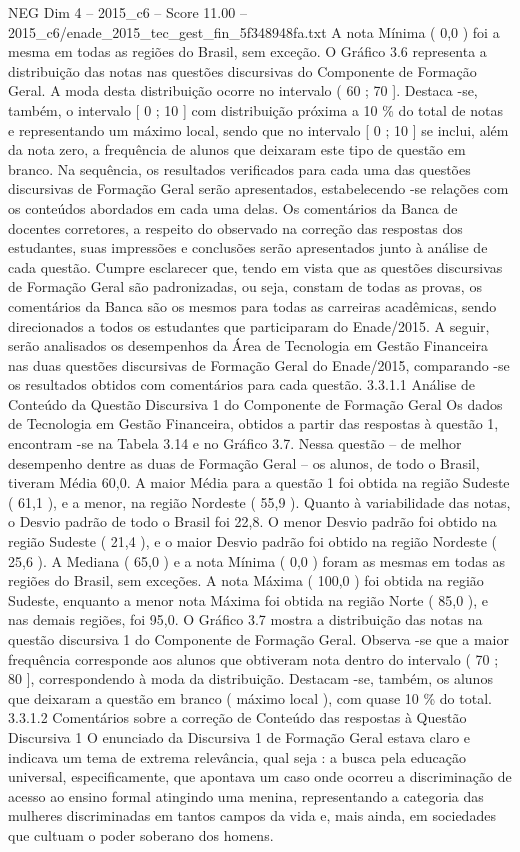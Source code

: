 \begin{textsample}{NEG Dim 4 – 2015\_c6 – Score 11.00 – 2015\_c6/enade\_2015\_tec\_gest\_fin\_5f348948fa.txt}
A nota Mínima ( 0,0 ) foi a mesma em todas as regiões do Brasil, sem exceção.
O Gráfico 3.6 representa a distribuição das notas nas questões discursivas do Componente de Formação Geral.
A moda desta distribuição ocorre no intervalo ( 60 ; 70 ].
Destaca -se, também, o intervalo [ 0 ; 10 ] com distribuição próxima a 10 \% do total de notas e representando um máximo local, sendo que no intervalo [ 0 ; 10 ] se inclui, além da nota zero, a frequência de alunos que deixaram este tipo de questão em branco.
Na sequência, os resultados verificados para cada uma das questões discursivas de Formação Geral serão apresentados, estabelecendo -se relações com os conteúdos abordados em cada uma delas.
Os comentários da Banca de docentes corretores, a respeito do observado na correção das respostas dos estudantes, suas impressões e conclusões serão apresentados junto à análise de cada questão.
Cumpre esclarecer que, tendo em vista que as questões discursivas de Formação Geral são padronizadas, ou seja, constam de todas as provas, os comentários da Banca são os mesmos para todas as carreiras acadêmicas, sendo direcionados a todos os estudantes que participaram do Enade/2015.
A seguir, serão analisados os desempenhos da Área de Tecnologia em Gestão Financeira nas duas questões discursivas de Formação Geral do Enade/2015, comparando -se os resultados obtidos com comentários para cada questão. 3.3.1.1 Análise de Conteúdo da Questão Discursiva 1 do Componente de Formação Geral Os dados de Tecnologia em Gestão Financeira, obtidos a partir das respostas à questão 1, encontram -se na Tabela 3.14 e no Gráfico 3.7.
Nessa questão – de melhor desempenho dentre as duas de Formação Geral – os alunos, de todo o Brasil, tiveram Média 60,0.
A maior Média para a questão 1 foi obtida na região Sudeste ( 61,1 ), e a menor, na região Nordeste ( 55,9 ).
Quanto à variabilidade das notas, o Desvio padrão de todo o Brasil foi 22,8.
O menor Desvio padrão foi obtido na região Sudeste ( 21,4 ), e o maior Desvio padrão foi obtido na região Nordeste ( 25,6 ).
A Mediana ( 65,0 ) e a nota Mínima ( 0,0 ) foram as mesmas em todas as regiões do Brasil, sem exceções.
A nota Máxima ( 100,0 ) foi obtida na região Sudeste, enquanto a menor nota Máxima foi obtida na região Norte ( 85,0 ), e nas demais regiões, foi 95,0.
O Gráfico 3.7 mostra a distribuição das notas na questão discursiva 1 do Componente de Formação Geral.
Observa -se que a maior frequência corresponde aos alunos que obtiveram nota dentro do intervalo ( 70 ; 80 ], correspondendo à moda da distribuição.
Destacam -se, também, os alunos que deixaram a questão em branco ( máximo local ), com quase 10 \% do total. 3.3.1.2 Comentários sobre a correção de Conteúdo das respostas à Questão Discursiva 1 O enunciado da Discursiva 1 de Formação Geral estava claro e indicava um tema de extrema relevância, qual seja : a busca pela educação universal, especificamente, que apontava um caso onde ocorreu a discriminação de acesso ao ensino formal atingindo uma menina, representando a categoria das mulheres discriminadas em tantos campos da vida e, mais ainda, em sociedades que cultuam o poder soberano dos homens.

\end{textsample}
